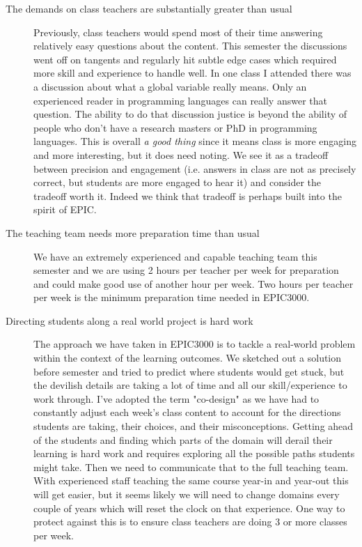 \documentclass[twoside=false,DIV=14]{scrartcl}
\begin{document}
\begin{description}
\item[The demands on class teachers are substantially greater than usual] Previously, class teachers would spend most of their time answering relatively easy questions about the content.  This semester the discussions went off on tangents and regularly hit subtle edge cases which required more skill and experience to handle well.  In one class I attended there was a discussion about what a global variable really means.  Only an experienced reader in programming languages can really answer that question.  The ability to do that discussion justice is beyond the ability of people who don't have a research masters or PhD in programming languages.  This is overall \emph{a good thing} since it means class is more engaging and more interesting, but it does need noting.  We see it as a tradeoff between precision and engagement (i.e. answers in class are not as precisely correct, but students are more engaged to hear it) and consider the tradeoff worth it.  Indeed we think that tradeoff is perhaps built into the spirit of EPIC.
\item[The teaching team needs more preparation time than usual] We have an extremely experienced and capable teaching team this semester and we are using 2 hours per teacher per week for preparation and could make good use of another hour per week.  Two hours per teacher per week is the minimum preparation time needed in EPIC3000.
\item[Directing students along a real world project is hard work]  The approach we have taken in EPIC3000 is to tackle a real-world problem within the context of the learning outcomes.  We sketched out a solution before semester and tried to predict where students would get stuck, but the devilish details are taking a lot of time and all our skill/experience to work through.  I've adopted the term "co-design" as we have had to constantly adjust each week's class content to account for the directions students are taking, their choices, and their misconceptions.  Getting ahead of the students and finding which parts of the domain will derail their learning is hard work and requires exploring all the possible paths students might take.  Then we need to communicate that to the full teaching team.  With experienced staff teaching the same course year-in and year-out this will get easier, but it seems likely we will need to change domains every couple of years which will reset the clock on that experience.  One way to protect against this is to ensure class teachers are doing 3 or more classes per week.

\end{description}
\end{document}
